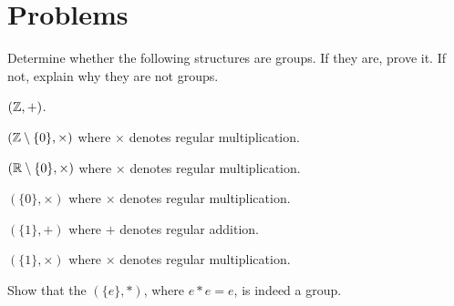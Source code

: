 \newpage

\section{Problems}
\begin{problem}
Determine whether the following structures are groups. If they are, prove it. If not, explain why they are not groups.
\begin{partquestions}{\alph*}
    \item $(\mathbb{Z}, +)$.
    \item $(\mathbb{Z} \setminus \{0\}, \times)$ where $\times$ denotes regular multiplication.
    \item $(\mathbb{R} \setminus \{0\}, \times)$ where $\times$ denotes regular multiplication.
    \item $(\{0\}, \times)$ where $\times$ denotes regular multiplication.
    \item $(\{1\}, +)$ where $+$ denotes regular addition.
    \item $(\{1\}, \times)$ where $\times$ denotes regular multiplication.
\end{partquestions}
\end{problem}

\begin{problem}
    Show that the  $(\{e\}, *)$, where $e \ast e = e$, is indeed a group.
\end{problem}
